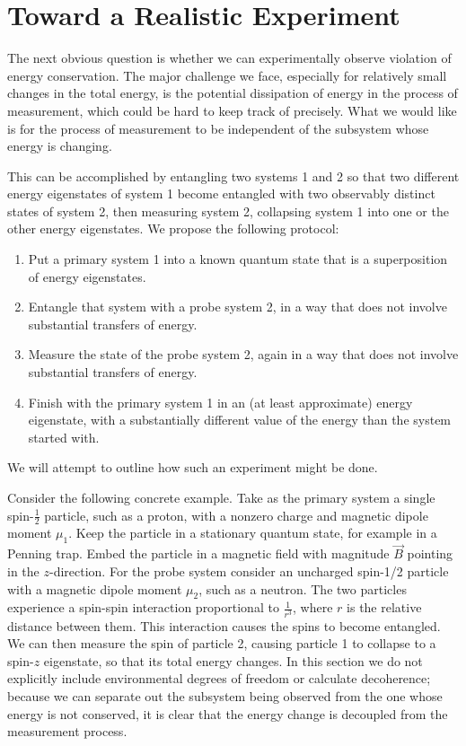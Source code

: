 \documentclass[aps,prd,onecolumn,nofootinbib,notitlepage]{revtex4-1}
\begin{document}
\section{Toward a Realistic Experiment}

The next obvious question is whether we can experimentally observe violation of energy conservation.
The major challenge we face, especially for relatively small changes in the total energy, is the potential dissipation of energy in the process of measurement, which could be hard to keep track of precisely.
What we would like is for the process of measurement to be independent of the subsystem whose energy is changing.

This can be accomplished by entangling two systems 1 and 2 so that two different energy eigenstates of system 1 become entangled with two observably distinct states of system 2, then measuring system 2, collapsing system 1 into one or the other energy eigenstates.
We propose the following protocol:
\begin{enumerate}
\item Put a primary system 1 into a known quantum state that is a superposition of energy eigenstates.
\item Entangle that system with a probe system 2, in a way that does not involve substantial transfers of energy.
\item Measure the state of the probe system 2, again in a way that does not involve substantial transfers of energy.
\item Finish with the primary system 1 in an (at least approximate) energy eigenstate, with a substantially different value of the energy than the system started with.
\end{enumerate}
We will attempt to outline how such an experiment might be done.

Consider the following concrete example.
Take as the primary system a single spin-$\frac{1}{2}$ particle, such as a proton, with a nonzero charge and magnetic dipole moment $\mu_1$.
Keep the particle in a stationary quantum state, for example in a Penning trap.
Embed the particle in a magnetic field with magnitude $\vec B$ pointing in the $z$-direction.
For the probe system consider an uncharged spin-1/2 particle with a magnetic dipole moment $\mu_2$, such as a neutron.
The two particles experience a spin-spin interaction proportional to $\frac{1}{r^3}$, where $r$ is the relative distance between them.
This interaction causes the spins to become entangled.
We can then measure the spin of particle 2, causing particle 1 to collapse to a spin-$z$ eigenstate, so that its total energy changes.
In this section we do not explicitly include environmental degrees of freedom or calculate decoherence; because we can separate out the subsystem being observed from the one whose energy is not conserved, it is clear that the energy change is decoupled from the measurement process.
\end{document}
